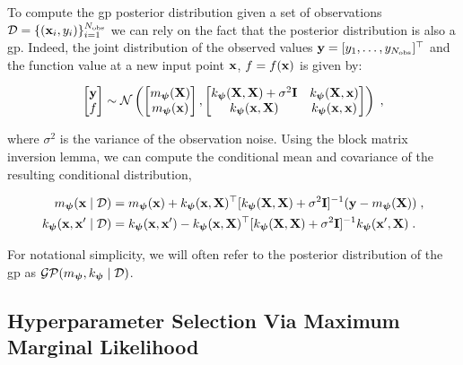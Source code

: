 \smallskip
To compute the \gls{gp} posterior distribution given a set of observations $\mathcal{D} = \{(\mathbf{x}_i, y_i)\}_{i=1}^{N_{\mathrm{obs}}}$ we can rely on the fact that the posterior distribution is also a \gls{gp}. Indeed, the joint distribution of the observed values $\mathbf{y} = [y_1, \ldots, y_{N_{\mathrm{obs}}}]^\top$ and the function value at a new input point $\mathbf{x}$, $f = f(\mathbf{x})$ is given by:

\begin{equation}
  \begin{bmatrix}
    \mathbf{y} \\
    f \\
  \end{bmatrix} \sim \mathcal{N}\left(
  \begin{bmatrix}
    m_{\boldsymbol{\psi}}(\mathbf{X}) \\
    m_{\boldsymbol{\psi}}(\mathbf{x}) \\
  \end{bmatrix},
  \begin{bmatrix}
    k_{\boldsymbol{\psi}}(\mathbf{X}, \mathbf{X}) + \sigma^2\mathbf{I} & k_{\boldsymbol{\psi}}(\mathbf{X}, \mathbf{x}) \\
    k_{\boldsymbol{\psi}}(\mathbf{x}, \mathbf{X}) & k_{\boldsymbol{\psi}}(\mathbf{x}, \mathbf{x})
  \end{bmatrix}\right)\;,
  \label{eq:gp_joint_distribution}
\end{equation}

where $\sigma^2$ is the variance of the observation noise. Using the block matrix inversion lemma, we can compute the conditional mean and covariance of the resulting conditional distribution,

\begin{equation}
  \begin{aligned}
    m_{\boldsymbol{\psi}}(\mathbf{x} \mid \mathcal{D}) &= m_{\boldsymbol{\psi}}(\mathbf{x}) + k_{\boldsymbol{\psi}}(\mathbf{x}, \mathbf{X})^\top[k_{\boldsymbol{\psi}}(\mathbf{X}, \mathbf{X}) + \sigma^2\mathbf{I}]^{-1}(\mathbf{y} - m_{\boldsymbol{\psi}}(\mathbf{X}))\;, \\
    k_{\boldsymbol{\psi}}(\mathbf{x}, \mathbf{x}' \mid \mathcal{D}) &= k_{\boldsymbol{\psi}}(\mathbf{x}, \mathbf{x}^\prime) - k_{\boldsymbol{\psi}}(\mathbf{x}, \mathbf{X})^\top[k_{\boldsymbol{\psi}}(\mathbf{X}, \mathbf{X}) + \sigma^2\mathbf{I}]^{-1}k_{\boldsymbol{\psi}}(\mathbf{x}^\prime,\mathbf{X})\;.
  \end{aligned}
  \label{eq:gp_posterior_gp}
\end{equation}

For notational simplicity, we will often refer to the posterior distribution of the \gls{gp} as $\mathcal{GP}(m_{\boldsymbol{\psi}}, k_{\boldsymbol{\psi}} \mid \mathcal{D})$.

\subsection{Hyperparameter Selection Via Maximum Marginal Likelihood}
\label{sec:ntools:gpr:mml}

